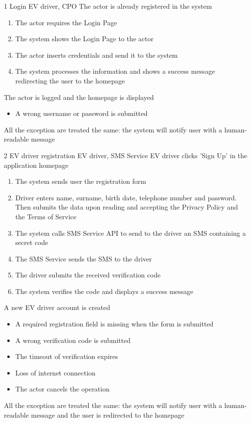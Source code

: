 \usecase
{1}
{Login}
{EV driver, CPO}
{The actor is already registered in the system}
{
    \begin{enumerate}
        \item The actor requires the Login Page
        \item The system shows the Login Page to the actor
        \item The actor inserts credentials and send it to the system
        \item The system processes the information and shows a success message redirecting the user to the homepage
    \end{enumerate}
}
{The actor is logged and the homepage is displayed}
{
    \begin{itemize}
        \item A wrong username or password is submitted
    \end{itemize}
}
{
    All the exception are treated the same: the system will notify user with a human-readable message
}


\usecase
{2}
{EV driver registration}
{EV driver, SMS Service}
{EV driver clicks 'Sign Up' in the application homepage}
{
    \begin{enumerate}
        \item The system sends user the registration form
        \item Driver enters name, surname, birth date, telephone number and password. Then submits the data upon reading and accepting the Privacy Policy and the Terms of Service
        \item The system calls SMS Service API to send to the driver an SMS containing a secret code
        \item The SMS Service sends the SMS to the driver
        \item The driver submits the received verification code
        \item The system verifies the code and displays a success message
    \end{enumerate}
}
{A new EV driver account is created}
{
    \begin{itemize}
        \item A required registration field is missing when the form is submitted
        \item A wrong verification code is submitted
        \item The timeout of verification expires
        \item Loss of internet connection
        \item The actor cancels the operation
    \end{itemize}
}
{
    All the exception are treated the same: the system will notify user with a human-readable message and the user is redirected to the homepage
}


